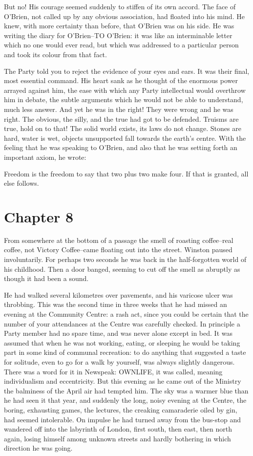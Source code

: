 \documentclass{article}
\begin{document}
But no! His courage seemed suddenly to stiffen of its own accord. The face
of O'Brien, not called up by any obvious association, had floated into his
mind. He knew, with more certainty than before, that O'Brien was on his
side. He was writing the diary for O'Brien--TO O'Brien: it was like an
interminable letter which no one would ever read, but which was addressed
to a particular person and took its colour from that fact.

The Party told you to reject the evidence of your eyes and ears. It was
their final, most essential command. His heart sank as he thought of
the enormous power arrayed against him, the ease with which any Party
intellectual would overthrow him in debate, the subtle arguments which he
would not be able to understand, much less answer. And yet he was in the
right! They were wrong and he was right. The obvious, the silly, and the
true had got to be defended. Truisms are true, hold on to that! The solid
world exists, its laws do not change. Stones are hard, water is wet,
objects unsupported fall towards the earth's centre. With the feeling that
he was speaking to O'Brien, and also that he was setting forth an important
axiom, he wrote:


   Freedom is the freedom to say that two plus two make four. If that is
granted, all else follows.




\section{Chapter 8}



From somewhere at the bottom of a passage the smell of roasting
coffee--real coffee, not Victory Coffee--came floating out into the street.
Winston paused involuntarily. For perhaps two seconds he was back in the
half-forgotten world of his childhood. Then a door banged, seeming to cut
off the smell as abruptly as though it had been a sound.

He had walked several kilometres over pavements, and his varicose ulcer
was throbbing. This was the second time in three weeks that he had missed
an evening at the Community Centre: a rash act, since you could be certain
that the number of your attendances at the Centre was carefully checked.
In principle a Party member had no spare time, and was never alone except
in bed. It was assumed that when he was not working, eating, or sleeping
he would be taking part in some kind of communal recreation: to do anything
that suggested a taste for solitude, even to go for a walk by yourself,
was always slightly dangerous. There was a word for it in Newspeak:
OWNLIFE, it was called, meaning individualism and eccentricity. But this
evening as he came out of the Ministry the balminess of the April air had
tempted him. The sky was a warmer blue than he had seen it that year, and
suddenly the long, noisy evening at the Centre, the boring, exhausting
games, the lectures, the creaking camaraderie oiled by gin, had seemed
intolerable. On impulse he had turned away from the bus-stop and wandered
off into the labyrinth of London, first south, then east, then north again,
losing himself among unknown streets and hardly bothering in which
direction he was going.
\end{document}
